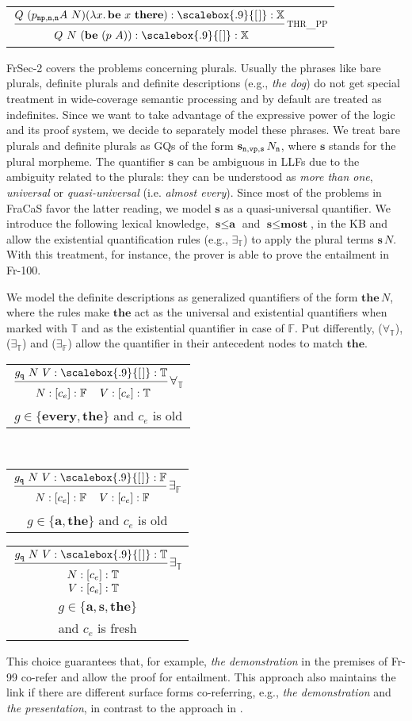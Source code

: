 \documentclass[11pt]{article}
\makeatletter
\newcommand{\elist}{\scalebox{.9}{[\kern1pt]}}
\newcommand{\rulen}[1]{{\normalfont\textsc{#1}}}
\newcommand{\synt}[1]{\textbf{#1}}
\newcommand{\X}{\mathbb{X}}
\newcommand{\T}{\mathbb{T}}
\newcommand{\F}{\mathbb{F}}
\newcommand{\np}{{\tt np}}
\newcommand{\sen}{{\tt s}}
\newcommand{\vp}{{\tt vp}}
\newcommand{\nou}{{\tt n}}
\newcommand{\qu}{{\tt q}}
\newcommand{\nonBranchingRule}[3][]{
\begin{tabular}{@{}c@{}}
$\dfrac{
	\begin{tabular}{@{}r@{}}
			#2
	\end{tabular}}
{
	\raisebox{-4pt}{
		\begin{tabular}[t]{@{}r@{}}
   			#3
	\end{tabular}}
}$#1
\end{tabular}}
\newcommand{\BranchingRule}[4][]{
\begin{tabular}{@{}c@{}}
$\dfrac{  
	\begin{tabular}{@{}r@{}}
			#2
	\end{tabular}
}
{
	\raisebox{-4pt}{
		\begin{tabular}[t]{@{}r@{}}
   			#3
		\end{tabular}} \kern3mm
	\raisebox{-4pt}{
		\begin{tabular}[t]{@{}r@{}}
   			#4
		\end{tabular}}
}$#1
\end{tabular}}
\makeatother
\begin{document}
\begin{center}
\nonBranchingRule[\rulen{thr\_pp}]
{$Q~ (p_{\np,\nou,\nou} A~ N)(\lambda x.\, \synt{be}~x~\synt{there}) : \elist : \X$}
{$Q~ N~ (\synt{be}~(p~A)) : \elist : \X$}
\end{center}

FrSec-2 covers the problems concerning plurals. 
Usually the phrases like bare plurals, definite plurals and definite descriptions (e.g., {\em the dog}) do not get special treatment in wide-coverage semantic processing and by default are treated as indefinites.
Since we want to take advantage of the expressive power of the logic and its proof system, we decide to separately model these phrases.
We treat bare plurals and definite plurals as GQs of the form $\synt{s}_{\nou,\vp,\sen}\,N_\nou$, where $\synt{s}$ stands for the plural morpheme.
The quantifier $\synt{s}$ can be ambiguous in LLFs due to the ambiguity related to the plurals: they can be understood as {\em more than one}, {\em universal} or {\em quasi-universal} (i.e. {\em almost every}).
Since most of the problems in FraCaS favor the latter reading, we model $\synt{s}$ as a quasi-universal quantifier.
We introduce the following lexical knowledge, $\synt{s} \leq \synt{a}$ and $\synt{s} \leq \synt{most}$, in the KB and allow the existential quantification rules (e.g., $\exists_\T$) to apply the plural terms $\synt{s}\,N$.     
With this treatment, for instance, the prover is able to prove the entailment in Fr-100.



We model the definite descriptions as generalized quantifiers of the form $\synt{the}\,N$, where the rules make $\synt{the}$ act as the universal and existential quantifiers when marked with $\T$ and as the existential quantifier  in case of $\F$.
Put differently, ($\forall_\T$), ($\exists_\T$) and ($\exists_\F$) allow the quantifier in their antecedent nodes to match $\synt{the}$.

\begin{center}
\parbox{46mm}{
\BranchingRule[$\forall_\T$\\$g \in \{\synt{every},\synt{the}\}$ and $c_e$ is old]
{$g_\qu~N~V : \elist : \T$}
{$N : [c_e] : \F$}
{$V : [c_e] : \T$}
\\[2mm]
\BranchingRule[$\exists_\F$\\$g \in \{\synt{a},\synt{the}\}$ and $c_e$ is old]
{$g_\qu~N~V : \elist : \F$}
{$N : [c_e] : \F$}
{$V : [c_e] : \F$}
}
\nonBranchingRule[$\exists_\T$\\$g \in \{\synt{a},\synt{s},\synt{the}\}$\\and $c_e$ is fresh]
{$g_\qu~N~V : \elist : \T$}
{$N : [c_e] : \T$\\$V : [c_e] : \T$}
\end{center}
%
This choice guarantees that, for example, {\em the demonstration} in the premises of Fr-99 co-refer and allow the proof for entailment.
This approach also maintains the link if there are different surface forms co-referring, e.g., {\em the demonstration} and {\em the presentation}, in contrast to the approach in .  
\end{document}

